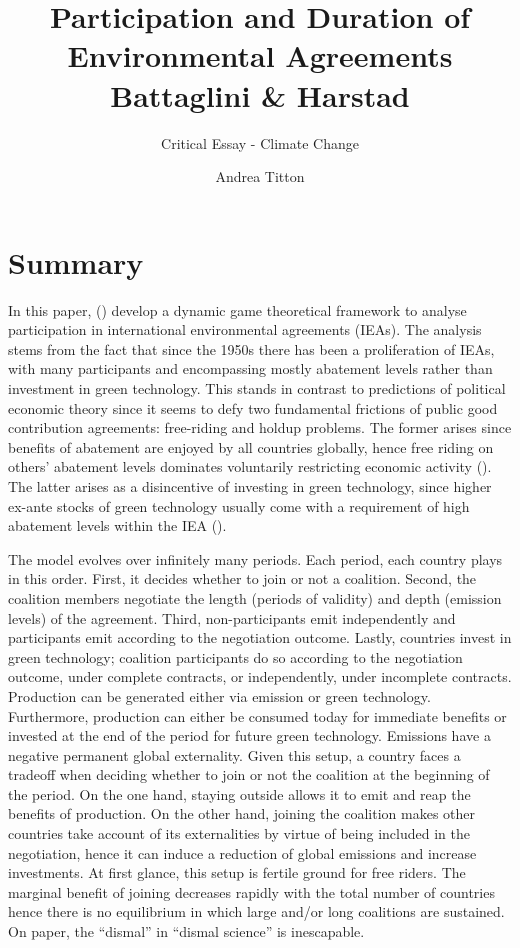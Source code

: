 \documentclass[american]{scrartcl}
\title{Participation and Duration of Environmental Agreements \\ Battaglini \& Harstad}
\subtitle{Critical Essay - Climate Change}
\author{Andrea Titton}
\newcommand{\citein}[1]{\citeauthor{#1} (\citeyear{#1})}
\begin{document}
\maketitle


\section{Summary}

In this paper, \citein{Battaglini2016} develop a dynamic game theoretical framework to analyse participation in international environmental agreements (IEAs). The analysis stems from the fact that since the 1950s there has been a proliferation of IEAs, with many participants and encompassing mostly abatement levels rather than investment in green technology. This stands in contrast to predictions of political economic theory since it seems to defy two fundamental frictions of public good contribution agreements: free-riding and holdup problems. The former arises since benefits of abatement are enjoyed by all countries globally, hence free riding on others' abatement levels dominates voluntarily restricting economic activity (\cite{EspnolaArredondo2011}). The latter arises as a disincentive of investing in green technology, since higher ex-ante stocks of green technology usually come with a requirement of high abatement levels within the IEA (\cite{Harstad2012}).

The model evolves over infinitely many periods. Each period, each country plays in this order. First, it decides whether to join or not a coalition. Second, the coalition members negotiate the length (periods of validity) and depth (emission levels) of the agreement. Third, non-participants emit independently and participants emit according to the negotiation outcome. Lastly, countries invest in green technology; coalition participants do so according to the negotiation outcome, under complete contracts, or independently, under incomplete contracts. Production can be generated either via emission or green technology. Furthermore, production can either be consumed today for immediate benefits or invested at the end of the period for future green technology. Emissions have a negative permanent global externality. Given this setup, a country faces a tradeoff when deciding whether to join or not the coalition at the beginning of the period. On the one hand, staying outside allows it to emit and reap the benefits of production. On the other hand, joining the coalition makes other countries take account of its externalities by virtue of being included in the negotiation, hence it can induce a reduction of global emissions and increase investments. At first glance, this setup is fertile ground for free riders. The marginal benefit of joining decreases rapidly with the total number of countries hence there is no equilibrium in which large and/or long coalitions are sustained. On paper, the ``dismal'' in ``dismal science'' is inescapable. %
\end{document}
